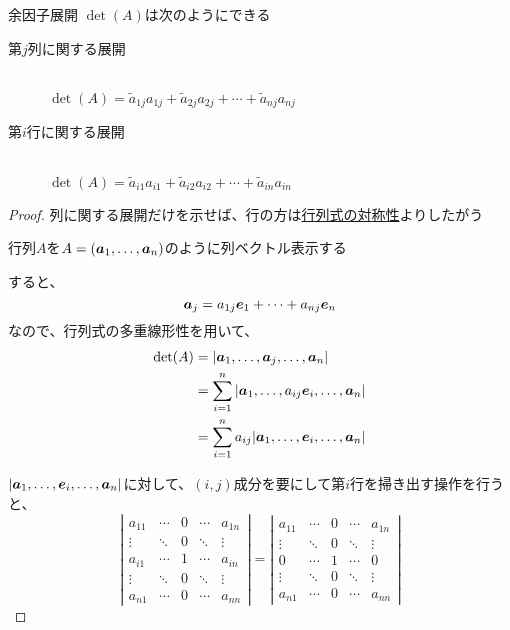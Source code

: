 \documentclass[../../../topic_linear-algebra]{subfiles}
\begin{document}
\begin{theorem}{余因子展開}
  $\det(A)$は次のようにできる
  \begin{description}
    \item[第$j$列に関する展開]~\\ $\det(A) = \tilde{a}_{1j} a_{1j} + \tilde{a}_{2j} a_{2j} + \cdots + \tilde{a}_{nj} a_{nj}$
    \item[第$i$行に関する展開]~\\ $\det(A) = \tilde{a}_{i1} a_{i1} + \tilde{a}_{i2} a_{i2} + \cdots + \tilde{a}_{in} a_{in}$
  \end{description}
\end{theorem}

\begin{proof}
  列に関する展開だけを示せば、行の方は\hyperref[thm:determinant-transpose-invariance]{行列式の対称性}よりしたがう

  \br

  行列$A$を$A = (\vb*{a}_1, \ldots, \vb*{a}_n)$のように列ベクトル表示する

  すると、
  \begin{equation*}
    \vb*{a}_j = a_{1j} \vb*{e}_1 + \cdots + a_{nj} \vb*{e}_n
  \end{equation*}
  なので、行列式の多重線形性を用いて、
  \begin{align*}
    \det(A) & = | \vb*{a}_1, \ldots, \vb*{a}_j, \ldots, \vb*{a}_n |                       \\
            & = \sum_{i=1}^{n} | \vb*{a}_1, \ldots, a_{ij} \vb*{e}_i, \ldots, \vb*{a}_n | \\
            & = \sum_{i=1}^{n} a_{ij} | \vb*{a}_1, \ldots, \vb*{e}_i, \ldots, \vb*{a}_n |
  \end{align*}

  $| \vb*{a}_1, \ldots, \vb*{e}_i, \ldots, \vb*{a}_n |$に対して、$(i,j)$成分を要にして第$i$行を掃き出す操作を行うと、
  \begin{equation*}
    \left| \begin{matrix}
      a_{11} & \cdots & 0 & \cdots & a_{1n} \\
      \vdots & \ddots & 0 & \ddots & \vdots \\
      a_{i1} & \cdots & 1 & \cdots & a_{in} \\
      \vdots & \ddots & 0 & \ddots & \vdots \\
      a_{n1} & \cdots & 0 & \cdots & a_{nn}
    \end{matrix} \right| = \left| \begin{matrix}
      a_{11} & \cdots & 0 & \cdots & a_{1n} \\
      \vdots & \ddots & 0 & \ddots & \vdots \\
      0      & \cdots & 1 & \cdots & 0      \\
      \vdots & \ddots & 0 & \ddots & \vdots \\
      a_{n1} & \cdots & 0 & \cdots & a_{nn}
    \end{matrix} \right|
  \end{equation*}


\end{proof}
\end{document}
